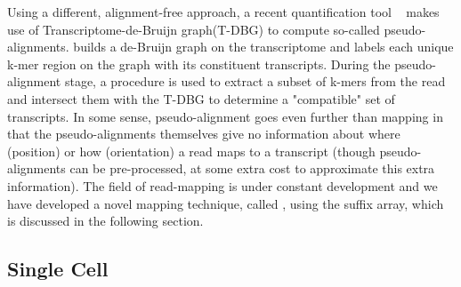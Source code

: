 Using a different, alignment-free approach, a recent quantification tool \kallisto~\citep{Bray:2015:Kallisto} makes use of Transcriptome-de-Bruijn graph(T-DBG) to compute so-called pseudo-alignments. \kallisto builds a de-Bruijn graph on the transcriptome and labels each unique k-mer region on the graph with its constituent transcripts. During the pseudo-alignment stage, a procedure is used to extract a subset of k-mers from the read and intersect them with the T-DBG to determine a "compatible" set of transcripts. In some sense, pseudo-alignment goes even further than mapping in that the pseudo-alignments themselves give no information about where (position) or how (orientation) a read maps to a transcript (though pseudo-alignments can be pre-processed, at some extra cost to approximate this extra information). The field of read-mapping is under constant development and we have developed a novel mapping technique, called \qm, using the suffix array, which is discussed in the following section.

\subsection{Single Cell} \label{singlecell}
